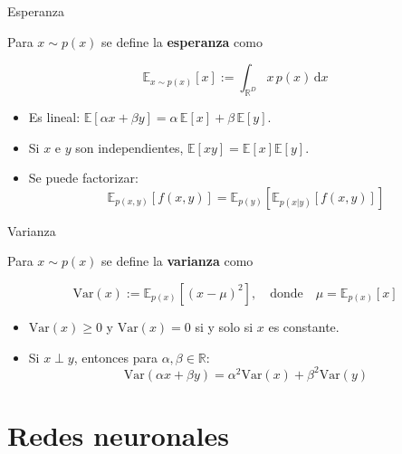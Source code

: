 \documentclass{beamer}
\newcommand{\R}{\mathbb{R}}
\begin{document}
\begin{frame}{Esperanza}

    Para $x\sim p(x)$ se define la \textbf{esperanza} como

    \begin{equation*}
        \mathbb{E}_{x\sim p(x)}\left[x\right]:=\int_{\R^D} x\, p(x)\,\text{d}x
    \end{equation*}


    \begin{itemize}
        \item Es lineal: $\mathbb{E}\left[\alpha x+\beta y\right] = \alpha\,\mathbb{E}\left[x\right] + \beta\,\mathbb{E}\left[y\right]$.
        \item Si $x$ e $y$ son independientes, $\mathbb{E}\left[xy\right]=\mathbb{E}\left[x\right]\mathbb{E}\left[y\right]$.
        \item Se puede factorizar:
              \begin{equation*}
                  \mathbb{E}_{p(x,y)}[f(x,y)] = \mathbb{E}_{p(y)}\left[\mathbb{E}_{p(x|y)}[f(x,y)]\right]
              \end{equation*}

    \end{itemize}
\end{frame}

\begin{frame}{Varianza}

    Para $x\sim p(x)$ se define la \textbf{varianza} como

    \begin{equation*}
        \text{Var}(x):=\mathbb{E}_{p(x)}\left[(x-\mu)^2\right],
        \quad\text{donde}\quad
        \mu=\mathbb{E}_{p(x)}\left[x\right]
    \end{equation*}


    \begin{itemize}
        \item $\text{Var}(x)\geq0$ y $\text{Var}(x)=0$ si y solo si $x$ es constante.
        \item Si $x\perp y$, entonces para $\alpha,\beta\in\R$:
              \begin{equation*}
                  \text{Var}(\alpha x+\beta y)=\alpha^2\text{Var}(x)+\beta^2\text{Var}(y)
              \end{equation*}

    \end{itemize}
\end{frame}

\section{Redes neuronales}
\end{document}
